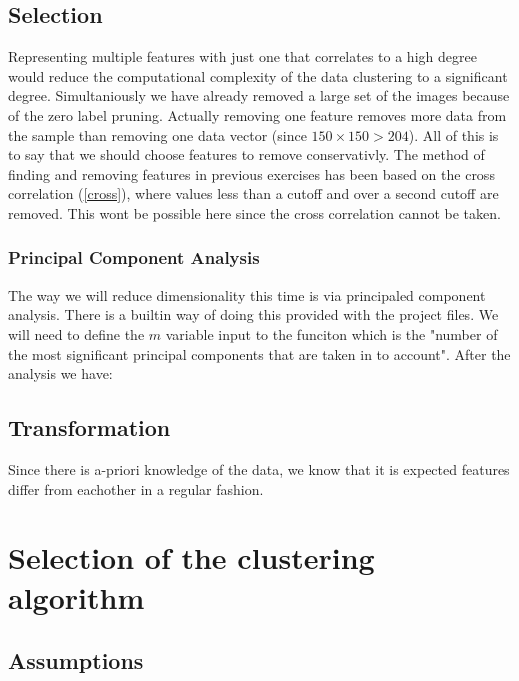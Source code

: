 \documentclass[12pt, a4paper]{article}
\begin{document}
\subsection{Selection}

Representing multiple features with just one that correlates to a high degree would reduce the computational complexity of the data clustering to a significant degree. Simultaniously we have already removed a large set of the images because of the zero label pruning. Actually removing one feature removes more data from the sample than removing one data vector (since $150\times150>204$). All of this is to say that we should choose features to remove conservativly. The method of finding and removing features in previous exercises has been based on the cross correlation (\ref{cross}), where values less than a cutoff and over a second cutoff are removed. This wont be possible here since the cross correlation cannot be taken.
\newline

\subsubsection{Principal Component Analysis}

The way we will reduce dimensionality this time is via principaled component analysis. There is a builtin way of doing this provided with the project files. We will need to define the $m$ variable input to the funciton which is the "number of the most significant principal components that are taken in to account". After the analysis we have:
\newline



\subsection{Transformation}

Since there is a-priori knowledge of the data, we know that it is expected features differ from eachother in a regular fashion.

\section{Selection of the clustering algorithm}

\subsection{Assumptions}
\end{document}
